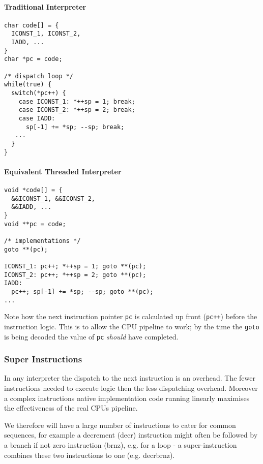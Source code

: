 \paragraph{Traditional Interpreter}

\begin{verbatim}
char code[] = {
  ICONST_1, ICONST_2,
  IADD, ...
}
char *pc = code;

/* dispatch loop */
while(true) {
  switch(*pc++) {
    case ICONST_1: *++sp = 1; break;
    case ICONST_2: *++sp = 2; break;
    case IADD:
      sp[-1] += *sp; --sp; break;
   ...
  }
}
\end{verbatim}

\paragraph{Equivalent Threaded Interpreter}

\begin{verbatim}
void *code[] = {
  &&ICONST_1, &&ICONST_2,
  &&IADD, ...
}
void **pc = code;

/* implementations */
goto **(pc);

ICONST_1: pc++; *++sp = 1; goto **(pc);
ICONST_2: pc++; *++sp = 2; goto **(pc);
IADD:
  pc++; sp[-1] += *sp; --sp; goto **(pc);
...
\end{verbatim}

Note how the next instruction pointer \texttt{pc} is calculated up front (\texttt{pc++}) before
the instruction logic. This is to allow the CPU pipeline to work; by the
time the \texttt{goto} is being decoded the value of \texttt{pc} \emph{should} have completed.

\subsubsection{Super Instructions}

In any interpreter the dispatch to the next instruction is an overhead. The
fewer instructions needed to execute logic then the less dispatching overhead.
Moreover a complex instruction\textquotesingle{}s native implementation code running linearly
maximises the effectiveness of the real CPU\textquotesingle{}s pipeline.

We therefore will have a large number of instructions to cater for common
sequences, for example a decrement (decr) instruction might often be followed by a
branch if not zero instruction (brnz), e.g. for a loop - a super-instruction combines
these two instructions to one (e.g. decrbrnz).

